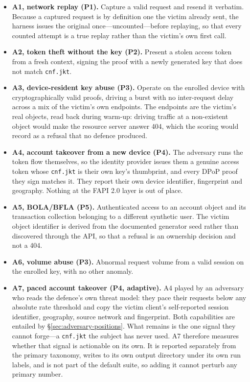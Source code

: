 \begin{itemize}
  \item \textbf{A1, network replay (P1).} Capture a valid request and resend it verbatim. Because a captured request is by definition one the victim already sent, the harness issues the original once---uncounted---before replaying, so that every counted attempt is a true replay rather than the victim's own first call.
  \item \textbf{A2, token theft without the key (P2).} Present a stolen access token from a fresh context, signing the proof with a newly generated key that does not match \texttt{cnf.jkt}.
  \item \textbf{A3, device-resident key abuse (P3).} Operate on the enrolled device with cryptographically valid proofs, driving a burst with no inter-request delay across a mix of the victim's own endpoints. The endpoints are the victim's real objects, read back during warm-up: driving traffic at a non-existent object would make the resource server answer 404, which the scoring would record as a refusal that no defence produced.
  \item \textbf{A4, account takeover from a new device (P4).} The adversary runs the token flow themselves, so the identity provider issues them a genuine access token whose \texttt{cnf.jkt} is their own key's thumbprint, and every DPoP proof they sign matches it. They report their own device identifier, fingerprint and geography. Nothing at the FAPI 2.0 layer is out of place.
  \item \textbf{A5, BOLA/BFLA (P5).} Authenticated access to an account object and its transaction collection belonging to a different synthetic user. The victim object identifier is derived from the documented generator seed rather than discovered through the API, so that a refusal is an ownership decision and not a 404.
  \item \textbf{A6, volume abuse (P3).} Abnormal request volume from a valid session on the enrolled key, with no other anomaly.
  \item \textbf{A7, paced account takeover (P4, adaptive).} A4 played by an adversary who reads the defence's own threat model: they pace their requests below any absolute rate threshold and copy the victim client's self-reported session identifier, geography, source network and fingerprint. Both capabilities are entailed by \S\ref{sec:adversary-positions}. What remains is the one signal they cannot forge---a \texttt{cnf.jkt} the subject has never used. A7 therefore measures whether that signal is actionable on its own. It is reported separately from the primary taxonomy, writes to its own output directory under its own run labels, and is not part of the default suite, so adding it cannot perturb any primary number.
\end{itemize}

